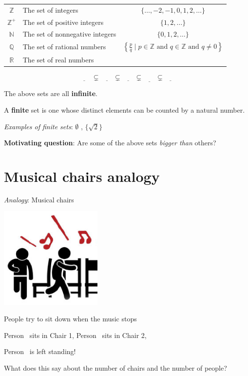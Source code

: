 \documentclass[12pt, oneside]{article}
\begin{document}
\begin{tabular}{clc}
    $\mathbb{Z}$ &  The  set of integers  & $\{ \ldots, -2, -1, 0,  1, 2, \ldots\}$ \\
    $\mathbb{Z}^+$ &  The  set of positive integers  & $\{1, 2, \ldots\}$ \\
    $\mathbb{N}$ &  The  set of nonnegative integers  & $\{0, 1, 2, \ldots\}$ \\
    $\mathbb{Q}$ &  The  set of rational numbers  & $\left\{ \frac{p}{q} \mid p \in \mathbb{Z}  \text{ and  } q  \in \mathbb{Z} \text{ and } q \neq  0 \right\}$\\
    $\mathbb{R}$ & The  set  of  real numbers &  \\
    \end{tabular}
    \[
    \underline{\phantom{\mathbb{Z}^+}} ~~\subsetneq~~ \underline{\phantom{\mathbb{N}~}} ~~\subsetneq ~~\underline{\phantom{\mathbb{Z}~}}~~ \subsetneq~~ \underline{\phantom{\mathbb{Q}~}} 
    ~~\subsetneq~~ \underline{\phantom{\mathbb{R}~}} 
    \]
    
    
    The above sets are all {\bf infinite}.
    
    
    A {\bf finite} set is one whose distinct elements can be counted by a natural number.
    
    {\it Examples of finite sets}: $\emptyset$ , $\{ \sqrt{2} \}$
    
    
    {\bf Motivating question}: Are some of the above sets {\it bigger than} others? \vfill
\section*{Musical chairs analogy}


{\it Analogy}: Musical chairs

\begin{multicols}{2}
\includegraphics[width=2in]{../../resources/images/musicalChairs.png}
\columnbreak

People try to sit down when the music stops

Person\sun~ sits in Chair 1,
Person\smiley~ sits in Chair 2,

Person\frownie~  is left standing!
\end{multicols}
What does this say about the number of chairs and the number of people? \vfill
\end{document}
